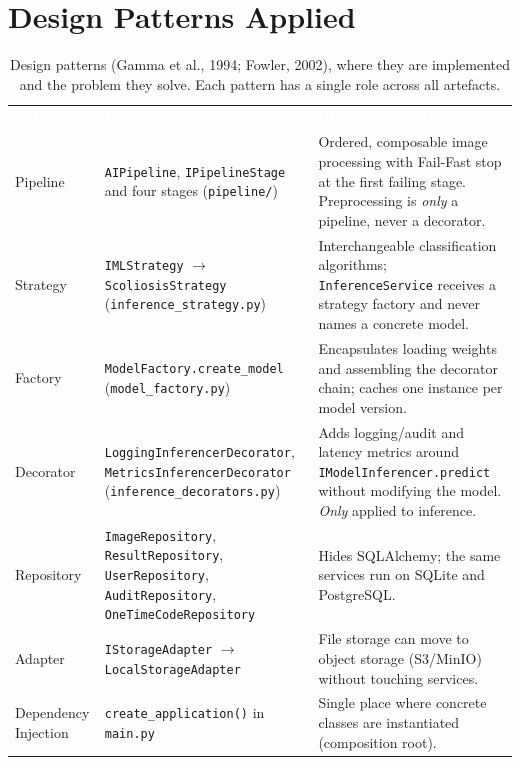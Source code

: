 \documentclass[12pt,a4paper]{article}
\newcommand{\fp}[1]{\nolinkurl{#1}}
\newcommand{\hd}[1]{\textcolor{white}{\textbf{#1}}}
\begin{document}
\section{Design Patterns Applied}
\label{sec:patterns}

\begin{table}[H]
\centering
\caption{Design patterns (Gamma et al., 1994; Fowler, 2002), where they are implemented and the problem they solve. Each pattern has a single role across all artefacts.}
\label{tab:patterns}
\renewcommand{\arraystretch}{1.3}
\begin{tabularx}{\textwidth}{L{2.2cm} L{4.1cm} Y}
\hd{Pattern} & \hd{Classes (file)} & \hd{Problem solved} \\
Pipeline & \texttt{AIPipeline}, \texttt{IPipelineStage} and four stages (\texttt{pipeline/}) & Ordered, composable image processing with Fail-Fast stop at the first failing stage. Preprocessing is \emph{only} a pipeline, never a decorator. \\
Strategy & \texttt{IMLStrategy} $\to$ \texttt{ScoliosisStrategy} (\fp{inference_strategy.py}) & Interchangeable classification algorithms; \texttt{InferenceService} receives a strategy factory and never names a concrete model. \\
Factory & \fp{ModelFactory.create_model} (\texttt{model\_factory.py}) & Encapsulates loading weights and assembling the decorator chain; caches one instance per model version. \\
Decorator & \fp{LoggingInferencerDecorator}, \fp{MetricsInferencerDecorator} (\fp{inference_decorators.py}) & Adds logging/audit and latency metrics around \fp{IModelInferencer.predict} without modifying the model. \emph{Only} applied to inference. \\
Repository & \texttt{ImageRepository}, \texttt{ResultRepository}, \texttt{UserRepository}, \texttt{AuditRepository}, \fp{OneTimeCodeRepository} & Hides SQLAlchemy; the same services run on SQLite and PostgreSQL. \\
Adapter & \texttt{IStorageAdapter} $\to$ \fp{LocalStorageAdapter} & File storage can move to object storage (S3/MinIO) without touching services. \\
Dependency Injection & \fp{create_application()} in \texttt{main.py} & Single place where concrete classes are instantiated (composition root). \\
\end{tabularx}
\end{table}
\end{document}
